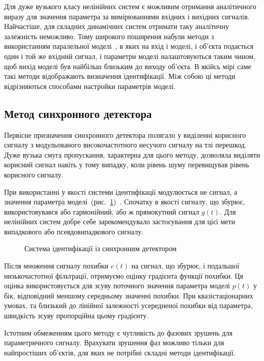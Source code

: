 Для дуже вузького класу нелінійних систем є можливим отримання
аналітичного виразу для значення параметра за вимірюваннями
вхідних і вихідних сигналів. Найчастіше, для складних динамічних
систем отримати таку аналітичну залежність неможливо. Тому
широкого поширення набули методи з використанням паралельної
моделі~\cite{lung_id_sys, gropp_methods_id, deith_method_id_ds}, в яких на вхід і моделі,
і об'єкта подається один і той же вхідний сигнал, і параметри
моделі налаштовуються таким чином, щоб вихід моделі був
найбільш близьким до виходу об'єкта. В якійсь мірі саме такі
методи відображають визначення ідентифікації. Між собою ці
методи відрізняються способами настройки параметрів моделі.


\subsection{Метод синхронного детектора} %

Первісне призначення синхронного детектора полягало у
виділенні корисного сигналу з модульованого високочастотного
несучого сигналу на тлі перешкод.
Дуже вузька смуга пропускання, характерна для цього методу,
дозволяла виділяти корисний сигнал навіть у тому випадку, коли
рівень шуму перевищував рівень корисного сигналу.

При використанні у якості системи ідентифікації
модулюється не сигнал, а значення параметра моделі~(рис.~\ref{atu:f:syncdet})~\cite{eykhoff_id_base}.
Спочатку в якості сигналу, що збурює,
використовувався або гармонійний, або ж прямокутний сигнал $g(t)$.
Для нелінійних систем добре себе зарекомендувало застосування
для цієї мети випадкового або псевдовипадкового  сигналу.

\begin{figure}[htb!]
\begin{center}

\end{center}
\caption{Система ідентифікації із синхронним детектором}
\label{atu:f:syncdet}
\end{figure}

Після множення сигналу похибки
$ e (t) $ на сигнал, що збурює,
і подальшої низькочастотної фільтрації,
отримуємо оцінку градієнта функції похибки.
Ця оцінка використовується для
зсуву поточного значення параметра моделі $p(t)$
у бік, відповідний меншому середньому значенні похибки.
При квазістаціонарних умовах, та близький до лінійної залежності
усередненої похибки від параметра, швидкість
зсуву пропорційна цьому градієнту.

Істотним обмеженням цього методу є чутливість до фазових
зрушень для параметричного сигналу. Врахувати зрушення фаз
можливо тільки для найпростіших об'єктів, для
яких не потрібні складні методи ідентифікації.

